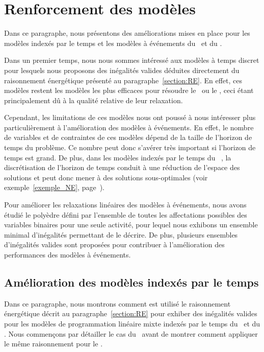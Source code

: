 \section{Renforcement des modèles}

Dans ce paragraphe, nous présentons des améliorations mises en place
pour les modèles indexés par le temps et les modèles à événements du
\RCPSP~et du \CECSP. 

Dans un premier temps, nous nous sommes intéressé aux modèles à temps
discret pour lesquels nous proposons des inégalités valides déduites
directement du raisonnement énergétique présenté au
paragraphe~\ref{section:RE}. En effet, ces modèles restent les modèles 
les plus efficaces pour résoudre le \CECSP~ou le \RCPSP, ceci étant
principalement dû à la qualité relative de leur relaxation. 

Cependant, les limitations de ces modèles nous ont poussé à nous
intéresser plus particulièrement à l'amélioration des modèles à
événements. En effet, le nombre de variables et de contraintes de ces
modèles dépend de la taille de l'horizon de temps du problème. Ce
nombre peut donc s'avérer très important si l'horizon de temps est grand.
De plus, dans les modèles indexés par le temps du \CECSP~, la
discrétisation de l'horizon de temps conduit à une réduction de
l'espace des solutions et peut donc mener à des solutions
sous-optimales (voir exemple~\ref{exemple_NE},
page~\pageref{exemple_NE}). 

Pour améliorer les relaxations linéaires des modèles à événements, nous
avons étudié le polyèdre défini par l'ensemble de toutes les
affectations possibles des variables binaires pour une seule activité,
pour lequel nous exhibons un ensemble minimal d'inégalités permettant
de le décrire. De plus, plusieurs ensembles d'inégalités valides sont
proposées pour contribuer à l'amélioration des performances des
modèles à événements.
 
\subsection{Amélioration des modèles indexés par le temps}

Dans ce paragraphe, nous montrons comment est utilisé le
raisonnement énergétique décrit au paragraphe~\ref{section:RE} pour
exhiber des inégalités valides pour les modèles de programmation
linéaire mixte indexés par le temps du \RCPSP~et du \CECSP. Nous
commençons par détailler le cas du \CECSP~avant de montrer comment
appliquer le même raisonnement pour le \RCPSP.

